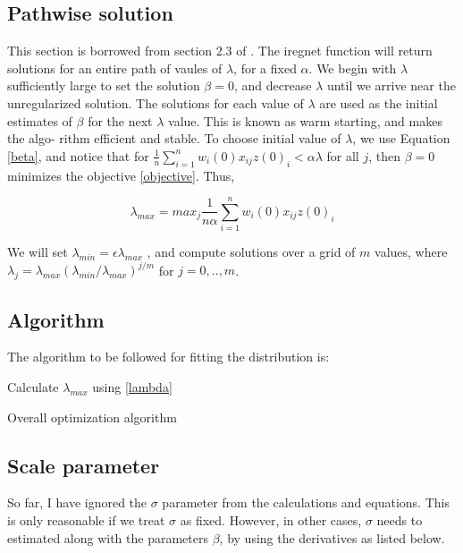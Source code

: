 \documentclass[12pt,a4paper]{report}
\begin{document}
\subsection*{Pathwise solution}
This section is borrowed from section 2.3 of \cite{a3}.
The iregnet function will return solutions for an entire path of vaules of $\lambda$, for a fixed $\alpha$.
We begin with $\lambda$ sufficiently large to set the solution $\beta = 0$, and decrease $\lambda$ until we arrive
near the unregularized solution. The solutions for each value of $\lambda$ are used as the initial
estimates of $\beta$ for the next $\lambda$ value. This is known as warm starting, and makes the algo-
rithm efficient and stable.
To choose initial value of $\lambda$, we use Equation \ref{beta}, and notice that for $\frac{1}{n} \sum_{i=1}^n w_i(0) x_{ij} z(0)_i < \alpha \lambda$ for all $j$, then $\beta = 0$ minimizes the objective \ref{objective}. Thus,

\begin{equation} \label{lambda}
\lambda_{max} = max_j \frac{1}{n \alpha} \sum_{i=1}^n w_i(0) x_{ij} z(0)_i
\end{equation}

We will set $\lambda_{min} = \epsilon \lambda_{max}$ , and compute solutions over a grid of $m$ values, where $\lambda_j = \lambda_{max}(\lambda_{min} / \lambda_{max})^{j/m}$ for $j = 0, .., m$.

\subsection*{Algorithm}
The algorithm to be followed for fitting the distribution is:

\begin{algorithm}[H]
\SetAlgoLined
 Calculate $\lambda_{max}$ using \ref{lambda} \;
 \caption{Overall optimization algorithm}
\end{algorithm}

\subsection*{Scale parameter}
So far, I have ignored the $\sigma$ parameter from the calculations and equations. This is only
reasonable if we treat $\sigma$ as fixed. However, in other cases, $\sigma$ needs to estimated along with the parameters $\beta$, by using the derivatives as listed below.
\end{document}
